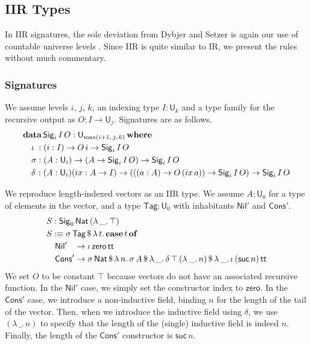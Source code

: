 \documentclass[acmsmall,screen,review,anonymous]{acmart}
\newcommand{\msf}[1]{{\mathsf{#1}}}
\newcommand{\mbf}[1]{{\mathbf{#1}}}
\newcommand{\data}{\mbf{data}}
\newcommand{\U}{\msf{U}}
\newcommand{\where}{\mbf{where}}
\newcommand{\Nat}{\msf{Nat}}
\newcommand{\zero}{\msf{zero}}
\newcommand{\suc}{\msf{suc}}
\newcommand{\Nil}{\msf{Nil}}
\newcommand{\Cons}{\msf{Cons}}
\newcommand{\Sig}{\msf{Sig}}
\newcommand{\Tag}{\msf{Tag}}
\newcommand{\case}{\mbf{case}}
\newcommand{\of}{\mbf{of}}
\newcommand{\ttt}{\msf{tt}}
\newcommand{\ix}{{ix}}
\begin{document}
\subsection{IIR Types}\label{sec:iir}

In IIR signatures, the sole deviation from Dybjer and Setzer is again our use of countable universe
levels \cite{TODO}. Since IIR is quite similar to IR, we present the rules without much commentary.

\subsubsection{Signatures}\label{sec:iir-signatures} We assume levels $i$, $j$, $k$, an indexing type $I : \U_k$ and a type family
for the recursive output as $O : I \to \U_j$. Signatures are as follows.
\begin{alignat*}{4}
  &\data\, \Sig_i\,I\,O : \U_{\max(i+1,\,j,\,k)}\,\where\\
  &\quad \iota\hspace{0.25em}  : (i : I) \to O\,i \to \Sig_i\,I\,O \\
  &\quad \sigma                : (A : \U_i) \to (A \to \Sig_i\,I\,O) \to \Sig_i\,I\,O \\
  &\quad \delta\hspace{0.1em}  : (A : \U_i)(\ix : A \to I) \to (((a : A) \to O\,(\ix\,a)) \to \Sig_i\,I\,O) \to \Sig_i\,I\,O
\end{alignat*}

\begin{example} We reproduce length-indexed vectors as an IIR type. We assume $A : \U_0$ for a type of elements in the vector,
and a type $\Tag : \U_0$ with inhabitants $\Nil'$ and $\Cons'$.
\begin{alignat*}{4}
  & S : \Sig_0\,\Nat\,(\lambda\,\_.\,\top)\\
  & S :\equiv \sigma\,\Tag\,\$\,\lambda\,t.\,\case\,t\,\of \\
  & \quad \Nil'\hspace{0.85em} \to \iota\,\zero\,\ttt \\
  & \quad \Cons'\to \sigma\,\Nat\,\$\,\lambda\,n.\,\sigma\,A\,\$\,\lambda\,\_.\,\delta\,\top\,(\lambda\,\_.\,n)\,\$\,\lambda\,\_.\,\iota\,(\suc\,n)\,\ttt
\end{alignat*}
We set $O$ to be constant $\top$ because vectors do not have an associated recursive function. In
the $\Nil'$ case, we simply set the constructor index to $\zero$. In the $\Cons'$ case, we introduce
a non-inductive field, binding $n$ for the length of the tail of the vector. Then, when we introduce
the inductive field using $\delta$, we use $(\lambda\,\_.\,n)$ to specify that the length of the
(single) inductive field is indeed $n$. Finally, the length of the $\Cons'$ constructor is $\suc\,n$.
\end{example}
\end{document}

